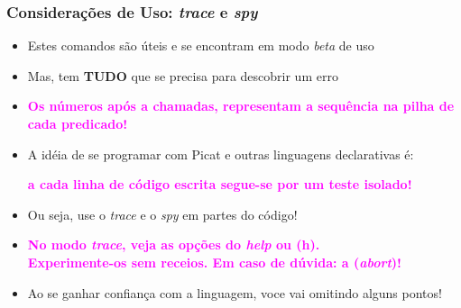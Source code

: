 \begin{frame}[fragile]

\frametitle{Considerações de Uso: \textit{trace} e \textit{spy} }

\begin{itemize}
  \item Estes comandos são úteis e se encontram em modo \textit{beta} de uso
  
  \item Mas, tem \textbf{TUDO} que se precisa para descobrir um erro
    \pause
    \item   \textcolor{magenta}{\textbf{Os números após a chamadas, representam a sequência na pilha de cada predicado!}} 

  
  \pause
  \item A idéia de se programar com Picat e outras linguagens
  declarativas é: 

  \pause
  \textcolor{magenta}{\textbf{a cada linha de código escrita segue-se por um teste isolado!}}

  \pause
  \item Ou seja,  use o \textit{trace} e o \textit{spy} em partes do código!

   \pause
    \item   \textcolor{magenta}{\textbf{No modo \textit{trace}, veja as opções do \textit{help} ou (h).\\
    Experimente-os sem receios. Em caso de dúvida: a (\textit{abort})!}} 

  \pause
  \item Ao se ganhar confiança com a linguagem, voce vai omitindo alguns pontos!

  
\end{itemize}

\end{frame}


